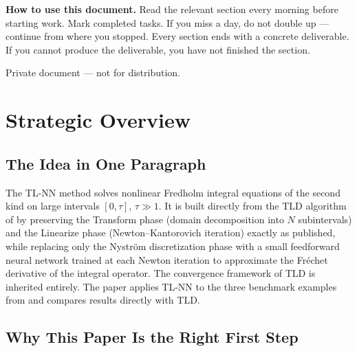 \documentclass[12pt,a4paper]{article}
\begin{document}
\begin{titlepage}
\begin{center}
\vspace{1.8cm}

\begin{tcolorbox}[warningstyle]
\noindent\textbf{How to use this document.}
Read the relevant section every morning before starting work.
Mark completed tasks.
If you miss a day, do not double up ---
continue from where you stopped.
Every section ends with a concrete deliverable.
If you cannot produce the deliverable, you have not
finished the section.
\end{tcolorbox}

\vfill
{\small\color{midgray}Private document --- not for distribution.}

\end{center}
\end{titlepage}

\newpage
\tableofcontents
\newpage

\section{Strategic Overview}

\subsection{The Idea in One Paragraph}

The TL-NN method solves nonlinear Fredholm integral equations
of the second kind on large intervals $[0,\tau]$, $\tau \gg 1$.
It is built directly from the TLD algorithm of \cite{sedka2025}
by preserving the Transform phase (domain decomposition into $N$
subintervals) and the Linearize phase (Newton--Kantorovich
iteration) exactly as published, while replacing only the
Nystr\"{o}m discretization phase with a small feedforward neural
network trained at each Newton iteration to approximate the
Fr\'{e}chet derivative of the integral operator.
The convergence framework of TLD is inherited entirely.
The paper applies TL-NN to the three benchmark examples from
\cite{sedka2025} and compares results directly with TLD.

\subsection{Why This Paper Is the Right First Step}
\end{document}
